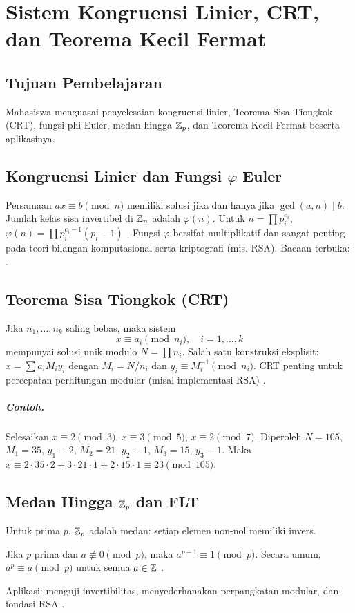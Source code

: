 \documentclass[../main.tex]{subfiles}
\begin{document}
\chapter{Sistem Kongruensi Linier, CRT, dan Teorema Kecil Fermat}

\section{Tujuan Pembelajaran}
Mahasiswa menguasai penyelesaian kongruensi linier, Teorema Sisa Tiongkok (CRT), fungsi phi Euler, medan hingga \(\mathbb{Z}_p\), dan Teorema Kecil Fermat beserta aplikasinya.

\section{Kongruensi Linier dan Fungsi \(\varphi\) Euler}
Persamaan \(ax\equiv b\pmod n\) memiliki solusi jika dan hanya jika \(\gcd(a,n)\mid b\). Jumlah kelas sisa invertibel di \(\mathbb{Z}_n\) adalah \(\varphi(n)\). Untuk \(n=\prod p_i^{e_i}\), \(\varphi(n)=\prod p_i^{e_i-1}(p_i-1)\) \citep{hoffstein}. Fungsi \(\varphi\) bersifat multiplikatif dan sangat penting pada teori bilangan komputasional serta kriptografi (mis. RSA). Bacaan terbuka: \citep{shoup_nt}.

\section{Teorema Sisa Tiongkok (CRT)}
Jika \(n_1,\dots,n_k\) saling bebas, maka sistem
\[ x\equiv a_i \pmod{n_i},\quad i=1,\dots,k \]
mempunyai solusi unik modulo \(N=\prod n_i\). Salah satu konstruksi eksplisit: \(x=\sum a_i M_i y_i\) dengan \(M_i=N/n_i\) dan \(y_i\equiv M_i^{-1}\pmod{n_i}\). CRT penting untuk percepatan perhitungan modular (misal implementasi RSA) \citep{menezes}.

\paragraph{Contoh.} Selesaikan \(x\equiv 2\pmod 3\), \(x\equiv 3\pmod 5\), \(x\equiv 2\pmod 7\). Diperoleh \(N=105\), \(M_1=35\), \(y_1\equiv 2\), \(M_2=21\), \(y_2\equiv 1\), \(M_3=15\), \(y_3\equiv 1\). Maka \(x\equiv 2\cdot35\cdot2+3\cdot21\cdot1+2\cdot15\cdot1\equiv 23\pmod{105}\).

\section{Medan Hingga \(\mathbb{Z}_p\) dan FLT}
Untuk prima \(p\), \(\mathbb{Z}_p\) adalah medan: setiap elemen non-nol memiliki invers.
\begin{theorem}
Jika \(p\) prima dan \(a\not\equiv 0\pmod p\), maka \(a^{p-1}\equiv 1\pmod p\). Secara umum, \(a^p\equiv a\pmod p\) untuk semua \(a\in\mathbb{Z}\) \citep{rosen}.
\end{theorem}
Aplikasi: menguji invertibilitas, menyederhanakan perpangkatan modular, dan fondasi RSA \citep{rsa}.
\end{document}
